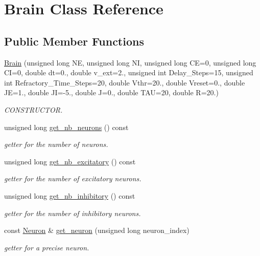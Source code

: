 \hypertarget{classBrain}{\section{Brain Class Reference}
\label{classBrain}
}
\subsection*{Public Member Functions}
\begin{DoxyCompactItemize}
\item 
\hyperlink{classBrain_ac319c036119b152ff89203b57129d5a0}{Brain} (unsigned long N\-E, unsigned long N\-I, unsigned long C\-E=0, unsigned long C\-I=0, double dt=0., double v\-\_\-ext=2., unsigned int Delay\-\_\-\-Steps=15, unsigned int Refractory\-\_\-\-Time\-\_\-\-Steps=20, double Vthr=20., double Vreset=0., double J\-E=1., double J\-I=-\/5., double J=0., double T\-A\-U=20, double R=20.)
\begin{DoxyCompactList}\small\item\em C\-O\-N\-S\-T\-R\-U\-C\-T\-O\-R. \end{DoxyCompactList}\item 
unsigned long \hyperlink{classBrain_ad91d2cdf1f02341e714e46d8fd2211c7}{get\-\_\-nb\-\_\-neurons} () const 
\begin{DoxyCompactList}\small\item\em getter for the number of neurons. \end{DoxyCompactList}\item 
unsigned long \hyperlink{classBrain_afe29b63acd6ce6a38634c9f533e40386}{get\-\_\-nb\-\_\-excitatory} () const 
\begin{DoxyCompactList}\small\item\em getter for the number of excitatory neurons. \end{DoxyCompactList}\item 
unsigned long \hyperlink{classBrain_ab8bb8e3dce88f5bea3de8171876556c3}{get\-\_\-nb\-\_\-inhibitory} () const 
\begin{DoxyCompactList}\small\item\em getter for the number of inhibitory neurons. \end{DoxyCompactList}\item 
const \hyperlink{classNeuron}{Neuron} \& \hyperlink{classBrain_ad255070c8fd86addf5a6c32ef09c3119}{get\-\_\-neuron} (unsigned long neuron\-\_\-index)
\begin{DoxyCompactList}\small\item\em getter for a precise neuron. \end{DoxyCompactList}\item 

\end{DoxyCompactItemize}
